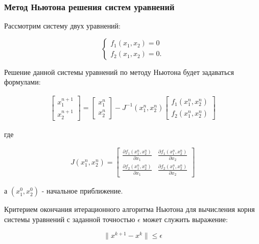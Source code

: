 \subsubsection{Метод Ньютона решения систем уравнений}
Рассмотрим систему двух уравнений:
\begin{center}
\begin{equation}
	\label{eq:newton_system}
		\begin{cases}
			f_1(x_1, x_2) = 0 \\
			f_2(x_1, x_2) = 0.
		\end{cases}
\end{equation}
\end{center}

Решение данной системы уравнений по методу Ньютона будет задаваться формулами:
\begin{center}
\begin{eqnarray}
	\label{eq:newton_system_2}
		\left[ \begin{array}{c}
			x_1^{n+1} \\
			x_2^{n+1}
		\end{array} \right]
	=
		\left[ \begin{array}{c}
			x_1^{n} \\
			x_2^{n}
		\end{array} \right]
	- J^{-1} (x_1^n, x_2^n)
		\left[ \begin{array}{c}
			f_1(x_1^n, x_2^n) \\
			f_2(x_1^n, x_2^n)
		\end{array} \right]
\end{eqnarray}
\end{center}
где 
\begin{center}
\begin{eqnarray}
	\label{eq:newton_system_3}
	J(x_1^n, x_2^n) = 
		\left[ \begin{array}{cc}
			\frac{\partial f_1 (x_1^n, x_2^n)}{\partial x_1} & \frac{\partial f_1 (x_1^n, x_2^n)}{\partial x_2} \\
			\frac{\partial f_2 (x_1^n, x_2^n)}{\partial x_1} & \frac{\partial f_2 (x_1^n, x_2^n)}{\partial x_2}
		\end{array} \right]
\end{eqnarray}
\end{center}
а ${(x_1^0, x_2^0)}$ - начальное приближение.

Критерием окончания итерационного алгоритма Ньютона для вычисления корня системы уравнений с заданной точностью ${\epsilon}$ может служить выражение:
\begin{center}
\begin{equation}
	\label{eq:newton_system_4}
	\|x^{k+1} - x^k\| \leq \epsilon
\end{equation}
\end{center}



\newpage
